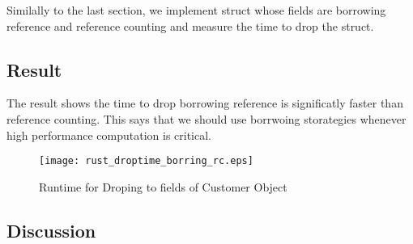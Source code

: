 Similally to the last section, we implement struct whose fields are borrowing reference and reference counting and measure the time to drop the struct. 


\subsection{Result}
The result shows the time to drop borrowing reference is significatly faster than reference counting. This says that we should use borrwoing storategies whenever high performance computation is critical.
\begin{figure}[htb!]
    \texttt{[image: rust\_droptime\_borring\_rc.eps]}
    \caption{Runtime for Droping to fields of Customer Object}
    \label{fig:Sampling}
\end{figure}

\subsection{Discussion}
